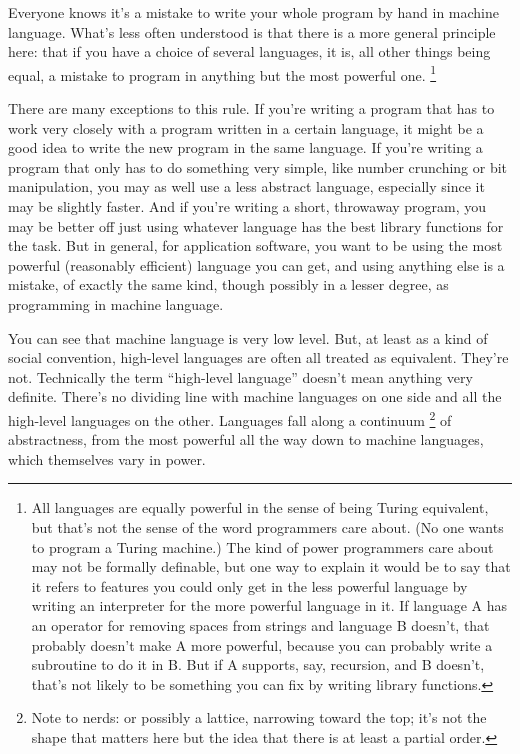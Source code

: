 Everyone knows it's a mistake to write your whole program by hand in
machine language. What's less often understood is that there is a more
general principle here: that if you have a choice of several languages,
it is, all other things being equal, a mistake to program in anything
but the most powerful one. \footnote{All languages are equally powerful in the sense of being Turing
equivalent, but that's not the sense of the word programmers care about.
(No one wants to program a Turing machine.) The kind of power
programmers care about may not be formally definable, but one way to
explain it would be to say that it refers to features you could only get
in the less powerful language by writing an interpreter for the more
powerful language in it. If language A has an operator for removing
spaces from strings and language B doesn't, that probably doesn't make A
more powerful, because you can probably write a subroutine to do it in
B. But if A supports, say, recursion, and B doesn't, that's not likely
to be something you can fix by writing library functions.}

There are many exceptions to this rule. If you're writing a program that
has to work very closely with a program written in a certain language,
it might be a good idea to write the new program in the same language.
If you're writing a program that only has to do something very simple,
like number crunching or bit manipulation, you may as well use a less
abstract language, especially since it may be slightly faster. And if
you're writing a short, throwaway program, you may be better off just
using whatever language has the best library functions for the task. But
in general, for application software, you want to be using the most
powerful (reasonably efficient) language you can get, and using anything
else is a mistake, of exactly the same kind, though possibly in a lesser
degree, as programming in machine language.

You can see that machine language is very low level. But, at least as a
kind of social convention, high-level languages are often all treated as
equivalent. They're not. Technically the term ``high-level language''
doesn't mean anything very definite. There's no dividing line with
machine languages on one side and all the high-level languages on the
other. Languages fall along a continuum \footnote{Note to nerds: or possibly a lattice, narrowing toward the top;
it's not the shape that matters here but the idea that there is at least
a partial order.} of abstractness, from
the most powerful all the way down to machine languages, which
themselves vary in power.

